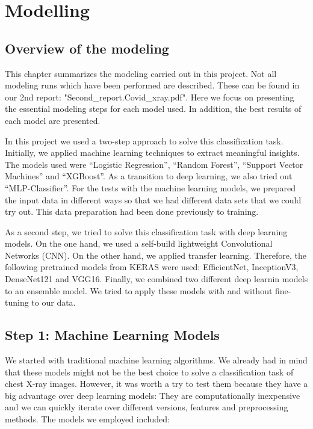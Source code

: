 \documentclass{article}
\begin{document}
\section{Modelling} \label{section:modelling}


\subsection{Overview of the modeling}
This chapter summarizes the modeling carried out in this project. Not all modeling runs which have been performed are described. These can be found in our 2nd report: "Second\_report.Covid\_xray.pdf". Here we focus on presenting the essential modeling steps for each model used. In addition, the best results of each model are presented. 

In this project we used a two-step approach to solve this classification task. Initially, we applied machine learning techniques to extract meaningful insights. The models used were “Logistic Regression”, “Random Forest”, “Support Vector Machines” and “XGBoost”. As a transition to deep learning, we also tried out “MLP-Classifier”. For the tests with the machine learning models, we prepared the input data in different ways so that we had different data sets that we could try out. This data preparation had been done previously to training. 

As a second step, we tried to solve this classification task with deep learning models. On the one hand, we used a self-build lightweight Convolutional Networks (CNN). On the other hand, we applied transfer learning. Therefore, the following pretrained models from KERAS were used: EfficientNet, InceptionV3, DenseNet121 and VGG16. Finally, we combined two different deep learnin models to an ensemble model. We tried to apply these models with and without fine-tuning to our data. 


\subsection{Step 1: Machine Learning Models}
We started with traditional machine learning algorithms. We already had in mind that these models might not be the best choice to solve a classification task of chest X-ray images. However, it was worth a try to test them because they have a big advantage over deep learning models: They are computationally inexpensive and we can quickly iterate over different versions, features and preprocessing methods. The models we employed included:
\end{document}
